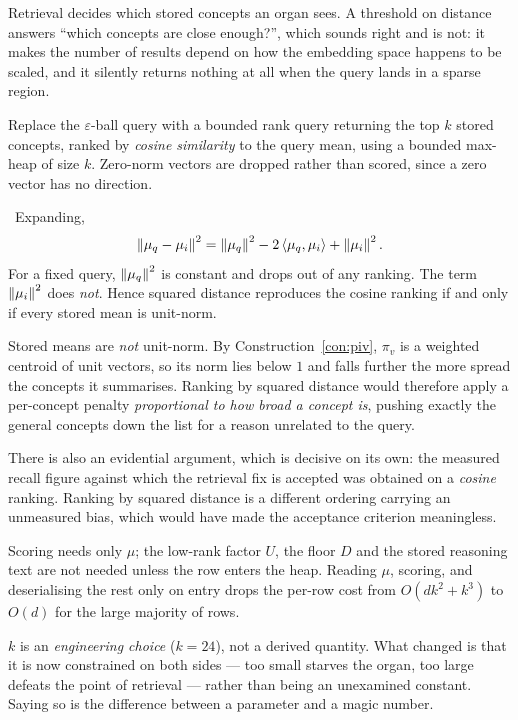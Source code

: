 \begin{intu}\Intu
Retrieval decides which stored concepts an organ sees. A threshold on
distance answers ``which concepts are close enough?'', which sounds
right and is not: it makes the number of results depend on how the
embedding space happens to be scaled, and it silently returns nothing at
all when the query lands in a sparse region.
\end{intu}

\begin{construction}\label{con:topk}
Replace the $\varepsilon$-ball query with a bounded rank query returning
the top $k$ stored concepts, ranked by \emph{cosine similarity} to the
query mean, using a bounded max-heap of size $k$. Zero-norm vectors are
dropped rather than scored, since a zero vector has no direction.
\end{construction}

\begin{proposition}\label{prop:cosine}
\Proved\ Expanding,
\[
  \left\lVert \mu_q-\mu_i \right\rVert^2
  =\left\lVert \mu_q \right\rVert^2-2\left\langle \mu_q,\mu_i\right\rangle+\left\lVert \mu_i \right\rVert^2 .
\]
For a fixed query, $\left\lVert \mu_q \right\rVert^2$ is constant and drops out of any
ranking. The term $\left\lVert \mu_i \right\rVert^2$ does \emph{not}. Hence squared
distance reproduces the cosine ranking if and only if every stored mean
is unit-norm.
\end{proposition}

\begin{hon}\Hon
Stored means are \emph{not} unit-norm. By
Construction~\ref{con:piv}, $\pi_v$ is a weighted centroid of unit
vectors, so its norm lies below $1$ and falls further the more spread
the concepts it summarises. Ranking by squared distance would therefore
apply a per-concept penalty \emph{proportional to how broad a concept
is}, pushing exactly the general concepts down the list for a reason
unrelated to the query.

There is also an evidential argument, which is decisive on its own: the
measured recall figure against which the retrieval fix is accepted was
obtained on a \emph{cosine} ranking. Ranking by squared distance is a
different ordering carrying an unmeasured bias, which would have made
the acceptance criterion meaningless.
\end{hon}

\begin{remark}[Cost]
Scoring needs only $\mu$; the low-rank factor $U$, the floor $D$ and the
stored reasoning text are not needed unless the row enters the heap.
Reading $\mu$, scoring, and deserialising the rest only on entry drops
the per-row cost from $O(dk^2+k^3)$ to $O(d)$ for the large majority of
rows.
\end{remark}

\begin{hon}\Hon
$k$ is an \emph{engineering choice} ($k=24$), not a derived quantity.
What changed is that it is now constrained on both sides --- too small
starves the organ, too large defeats the point of retrieval --- rather
than being an unexamined constant. Saying so is the difference between a
parameter and a magic number.
\end{hon}
